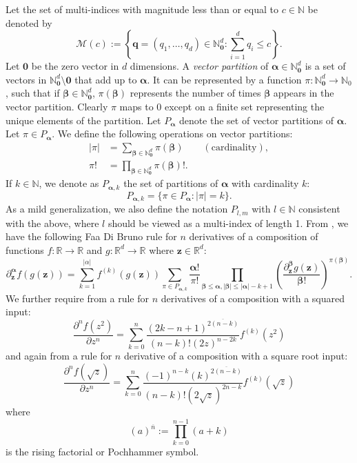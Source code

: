 \documentclass[12pt]{article}
\def\N{{\mathbb N}}
\def\R{{\mathbb R}}
\let\b=\boldsymbol
\def\risingfac#1#2{\left(#1\right)^{\overline{#2}}}
\theoremstyle{definition}
\theoremstyle{plain}
\theoremstyle{definition}
\begin{document}
Let the set of multi-indices with magnitude less than or equal to $c \in \N$ be denoted by
\[
\mathcal{M}(c) := \left\{ \b{q} = (q_1, \dots, q_d) \in \N^d_{\b{0}} : \sum_{i=1}^d q_i \leq c\right\}.
\]
Let $\b{0}$ be the zero vector in $d$ dimensions. A \emph{vector partition} of $\b{\alpha} \in \N^d_{\b{0}}$ is a set of vectors in $\N^d_{\b{0}} \setminus \b{0}$ that add up to $\b{\alpha}$. It can be represented by a function $\pi : \N^d_{\b{0}} \to \N_{0}$, such that if $\b{\beta} \in \N^d_{\b{0}}$, $\pi(\b{\beta})$ represents the number of times $\b{\beta}$ appears in the vector partition. Clearly $\pi$ maps to 0 except on a finite set representing the unique elements of the partition.  Let $P_{\b{\alpha}}$ denote the set of vector partitions of $\b{\alpha}$. Let $\pi \in P_{\b{\alpha}}$. We define the following operations on vector partitions:
\begin{align}
\label{eq:cardinality-part}
|\pi| &= \sum_{\b{\beta} \in \N^{d}_{\b{0}}} \pi(\b{\beta}) \qquad  (\text{cardinality}),\\
\pi! &= \prod_{\b{\beta} \in \N^{d}_{\b{0}}} \pi(\b{\beta})!.
\end{align}
If $k \in \N$, we denote as $P_{\b{\alpha}, k}$ the set of partitions of $\b{\alpha}$ with cardinality $k$:
\[
P_{\b{\alpha}, k} = \{ \pi \in P_{\b{\alpha}} : |\pi| = k\}.
\]
As a mild generalization, we also define the notation $P_{l,m}$ with $l\in\mathbb N$ consistent with the above, where $l$ should be viewed as a multi-index of length 1. From \cite{turcu2020vector}, we have the following Faa Di Bruno rule for $n$ derivatives of a composition of functions $f : \R \to \R$ and $g : \R^d \to \R$ where ${\b z} \in \R^d$:
\begin{equation}
\label{eq:multi-faa-di-bruno-2}
\partial^{\b\alpha}_{\b z} f(g({\b z})) = \sum_{k=1}^{|\alpha|} f^{(k)}(g(\b{z})) \sum_{\pi \in P_{\b{\alpha},k}} \frac{\b{\alpha}!}{\pi!} \prod_{\b{\beta} \leq \b{\alpha}, |\b{\beta}| \leq |\b{\alpha}|-k+1} \left( \frac{\partial^{\b{\beta}}_{\b{z}} g(\b{z})}{\b{\beta}!} \right)^{\pi(\b{\beta})}.
\end{equation}
We further require from \cite{functions.wolfram.com} a rule for $n$ derivatives of a composition with a squared input:
\begin{equation}
\label{eq:chain-rule-square}
\frac{\partial^n f(z^2)}{\partial z^n} = \sum_{k=0}^n \frac{\risingfac{2k-n+1}{2(n-k)}}{(n-k)!(2z)^{n-2k}} f^{(k)}(z^2)
\end{equation}
and again from \cite{functions.wolfram.com} a rule for $n$ derivative of a composition with a square root input:
\begin{equation}
\label{eq:chain-rule-root}
\frac{\partial^n f(\sqrt{z})}{\partial z^n} = \sum_{k=0}^n \frac{(-1)^{n-k} \risingfac{k}{2(n-k)}}{(n-k)!(2 \sqrt{z})^{2n-k}} f^{(k)}(\sqrt{z})
\end{equation}
where
\[\risingfac a n := \prod_{k=0}^{n-1} (a+k)\]
is the rising factorial or Pochhammer symbol.
\end{document}

